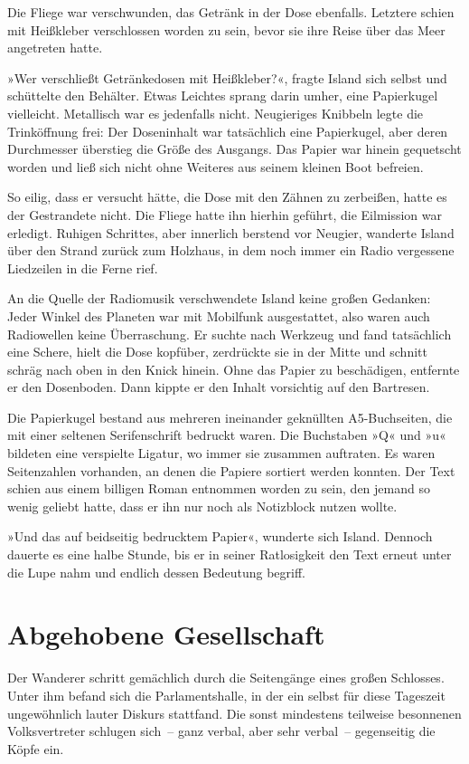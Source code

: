 Die Fliege war verschwunden, das Getränk in der Dose ebenfalls. Letztere schien mit Heißkleber verschlossen worden zu sein, bevor sie ihre Reise über das Meer angetreten hatte.

»Wer verschließt Getränkedosen mit Heißkleber?«, fragte Island sich selbst und schüttelte den Behälter. Etwas Leichtes sprang darin umher, eine Papierkugel vielleicht. Metallisch war es jedenfalls nicht. Neugieriges Knibbeln legte die Trinköffnung frei: Der Doseninhalt war tatsächlich eine Papierkugel, aber deren Durchmesser überstieg die Größe des Ausgangs. Das Papier war hinein gequetscht worden und ließ sich nicht ohne Weiteres aus seinem kleinen Boot befreien.

So eilig, dass er versucht hätte, die Dose mit den Zähnen zu zerbeißen, hatte es der Gestrandete nicht. Die Fliege hatte ihn hierhin geführt, die Eilmission war erledigt. Ruhigen Schrittes, aber innerlich berstend vor Neugier, wanderte Island über den Strand zurück zum Holzhaus, in dem noch immer ein Radio vergessene Liedzeilen in die Ferne rief.

An die Quelle der Radiomusik verschwendete Island keine großen Gedanken: Jeder Winkel des Planeten war mit Mobilfunk ausgestattet, also waren auch Radiowellen keine Überraschung. Er suchte nach Werkzeug und fand tatsächlich eine Schere, hielt die Dose kopfüber, zerdrückte sie in der Mitte und schnitt schräg nach oben in den Knick hinein. Ohne das Papier zu beschädigen, entfernte er den Dosenboden. Dann kippte er den Inhalt vorsichtig auf den Bartresen.

Die Papierkugel bestand aus mehreren ineinander geknüllten A5-Buchseiten, die mit einer seltenen Serifenschrift bedruckt waren. Die Buchstaben »Q« und »u« bildeten eine verspielte Ligatur, wo immer sie zusammen auftraten. Es waren Seitenzahlen vorhanden, an denen die Papiere sortiert werden konnten. Der Text schien aus einem billigen Roman entnommen worden zu sein, den jemand so wenig geliebt hatte, dass er ihn nur noch als Notizblock nutzen wollte.

»Und das auf beidseitig bedrucktem Papier«, wunderte sich Island. Dennoch dauerte es eine halbe Stunde, bis er in seiner Ratlosigkeit den Text erneut unter die Lupe nahm und endlich dessen Bedeutung begriff.


\chapter{Abgehobene Gesellschaft}

Der Wanderer schritt gemächlich durch die Seitengänge eines großen Schlosses. Unter ihm befand sich die Parlamentshalle, in der ein selbst für diese Tageszeit ungewöhnlich lauter Diskurs stattfand. Die sonst mindestens teilweise besonnenen Volksvertreter schlugen sich~– ganz verbal, aber sehr verbal~– gegenseitig die Köpfe ein.


